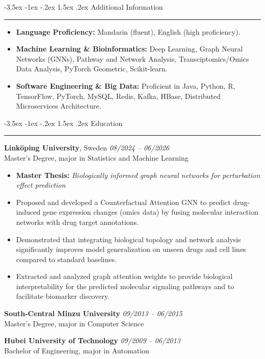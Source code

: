 \documentclass[11pt,a4paper]{article}
\makeatletter
\renewcommand{\section}{%
  \@startsection{section}{1}{\z@}%
  {-3.5ex \@plus -1ex \@minus -.2ex}%
  {1.5ex \@plus.2ex}%
  {\normalfont\Large\bfseries\scshape\color{blue!70!black}}%
}
\let\oldsection\section
\renewcommand{\section}[1]{\oldsection{#1}\vspace{-1ex}\noindent\rule{\linewidth}{1pt}\par\vspace{1ex}}
\makeatother
\begin{document}
\section{Additional Information}
\begin{itemize}
    \item \textbf{Language Proficiency:} Mandarin (fluent), English (high proficiency).
    \item \textbf{Machine Learning \& Bioinformatics:} Deep Learning, Graph Neural Networks (GNNs), Pathway and Network Analysis, Transciptomics/Omics Data Analysis, PyTorch Geometric, Scikit-learn.
    \item \textbf{Software Engineering \& Big Data:} Proficient in Java, Python, R, TensorFlow, PyTorch, MySQL, Redis, Kafka, HBase, Distributed Microservices Architecture.
\end{itemize}

\section{Education}

\textbf{Linköping University}, Sweden \hfill \textit{08/2024 -- 06/2026} \\
Master's Degree, major in Statistics and Machine Learning
\begin{itemize}
    \item \textbf{Master Thesis:} \textit{Biologically informed graph neural networks for perturbation effect prediction}
    \item Proposed and developed a Counterfactual Attention GNN to predict drug-induced gene expression changes (omics data) by fusing molecular interaction networks with drug target annotations.
    \item Demonstrated that integrating biological topology and network analysis significantly improves model generalization on unseen drugs and cell lines compared to standard baselines.
    \item Extracted and analyzed graph attention weights to provide biological interpretability for the predicted molecular signaling pathways and to facilitate biomarker discovery.
\end{itemize}

\vspace{5pt}

\textbf{South-Central Minzu University} \hfill \textit{09/2013 -- 06/2015} \\
Master's Degree, major in Computer Science

\vspace{5pt}

\textbf{Hubei University of Technology} \hfill \textit{09/2009 -- 06/2013} \\
Bachelor of Engineering, major in Automation
\end{document}
